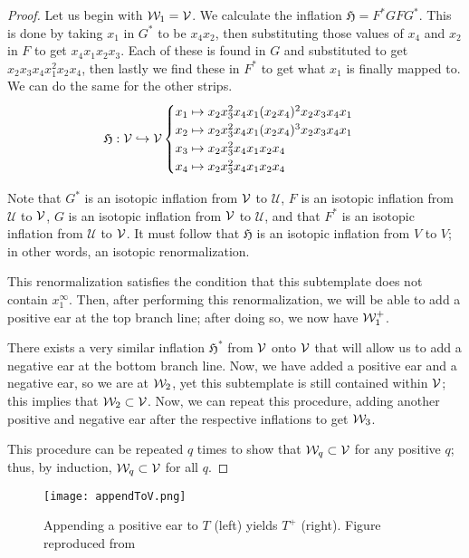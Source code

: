 \documentclass[paper.tex]{subfiles}
\begin{document}
\begin{proof}
Let us begin with $\mathcal{W}_1 = \mathcal{V}$. We calculate the inflation $\mathfrak{H} = F^* G F G^*$. This is done by taking $x_1$ in $G^*$ to be $x_4 x_2$, then substituting those values of $x_4$ and $x_2$ in $F$ to get $x_4 x_1 x_2 x_3$. Each of these is found in $G$ and substituted to get $x_2 x_3 x_4 x_1^2 x_2 x_4$, then lastly we find these in $F^*$ to get what $x_1$ is finally mapped to. We can do the same for the other strips.
    $$\mathfrak{H}: \mathcal{V} \hookrightarrow \mathcal{V} \begin{cases}
        x_1 \mapsto x_2 x_3^2 x_4 x_1 (x_2 x_4)^2 x_2 x_3 x_4 x_1 \\
        x_2 \mapsto x_2 x_3^2 x_4 x_1 (x_2 x_4)^3 x_2 x_3 x_4 x_1 \\
        x_3 \mapsto x_2 x_3^2 x_4 x_1  x_2 x_4  \\
        x_4 \mapsto x_2 x_3^2 x_4 x_1  x_2 x_4  \end{cases} $$

        Note that $G^*$ is an isotopic inflation from $\mathcal{V}$ to $\mathcal{U}$, $F$ is an isotopic inflation from $\mathcal{U}$ to $\mathcal{V}$, $G$ is an isotopic inflation from $\mathcal{V}$ to $\mathcal{U}$, and that $F^*$ is an isotopic inflation from $\mathcal{U}$ to $\mathcal{V}$. It must follow that $\mathfrak{H}$ is an isotopic inflation from $V$ to $V$; in other words, an isotopic renormalization.

        This renormalization satisfies the condition that this subtemplate does not contain $x_1^\infty$. Then, after performing this renormalization, we will be able to add a positive ear at the top branch line; after doing so, we now have $\mathcal{W}_1^+$.

        There exists a very similar inflation $\mathfrak{H}^*$ from $\mathcal{V}$ onto $\mathcal{V}$ that will allow us to add a negative ear at the bottom branch line. Now, we have added a positive ear and a negative ear, so we are at $\mathcal{W}_2$, yet this subtemplate is still contained within $\mathcal{V}$; this implies that $\mathcal{W}_2 \subset \mathcal{V}$. Now, we can repeat this procedure, adding another positive and negative ear after the respective inflations to get $\mathcal{W}_3$.

        This procedure can be repeated $q$ times to show that $\mathcal{W}_q \subset \mathcal{V}$ for any positive $q$; thus, by induction, $\mathcal{W}_q \subset \mathcal{V}$ for all $q$.
    \end{proof}


\begin{figure}[h]
    \centering
    \texttt{[image: appendToV.png]}
    \caption{Appending a positive ear to $T$ (left) yields $T^+$ (right). Figure reproduced from~\cite{Ghrist1996}} \label{fig:appendToV} %
\end{figure}
\end{document}
